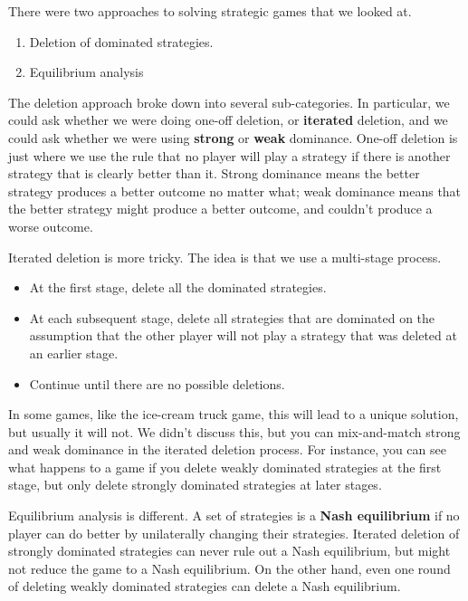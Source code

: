 There were two approaches to solving strategic games that we looked at.

\begin{enumerate}
\item{} Deletion of dominated strategies.

\item{} Equilibrium analysis

\end{enumerate}

The deletion approach broke down into several sub-categories. In particular, we could ask whether we were doing one-off deletion, or \textbf{iterated} deletion, and we could ask whether we were using \textbf{strong} or \textbf{weak} dominance. One-off deletion is just where we use the rule that no player will play a strategy if there is another strategy that is clearly better than it. Strong dominance means the better strategy produces a better outcome no matter what; weak dominance means that the better strategy might produce a better outcome, and couldn't produce a worse outcome.

Iterated deletion is more tricky. The idea is that we use a multi-stage process.

\begin{itemize}
\item{} At the first stage, delete all the dominated strategies.

\item{} At each subsequent stage, delete all strategies that are dominated on the assumption that the other player will not play a strategy that was deleted at an earlier stage.

\item{} Continue until there are no possible deletions.

\end{itemize}

In some games, like the ice-cream truck game, this will lead to a unique solution, but usually it will not. We didn't discuss this, but you can mix-and-match strong and weak dominance in the iterated deletion process. For instance, you can see what happens to a game if you delete weakly dominated strategies at the first stage, but only delete strongly dominated strategies at later stages.

Equilibrium analysis is different. A set of strategies is a \textbf{Nash equilibrium} if no player can do better by unilaterally changing their strategies. Iterated deletion of strongly dominated strategies can never rule out a Nash equilibrium, but might not reduce the game to a Nash equilibrium. On the other hand, even one round of deleting weakly dominated strategies can delete a Nash equilibrium.

